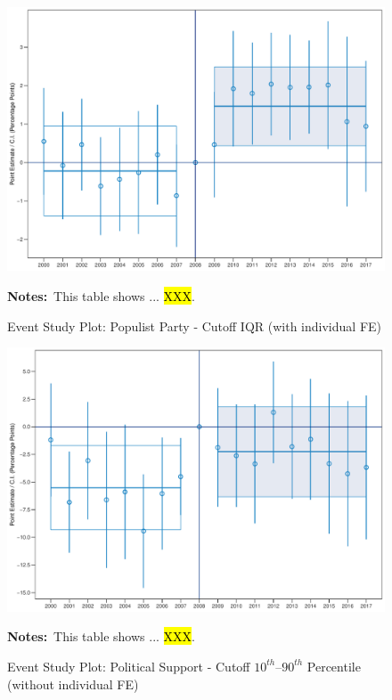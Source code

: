 \documentclass[11pt]{article}
\begin{document}
\begin{figure}[htbp!]
    \centering
    \caption{Event Study Plot: Populist Party - Cutoff IQR (with individual FE)}\label{fig:dynamic_did_cbk_past_mean_pp_iqr_ife}
    \includegraphics[width=1\linewidth]{events/dynamic_did_cbk_past_mean_pp_iqr_ife}
    \begin{tablenotes}
        \footnotesize
        \item \textbf{Notes:}~This table shows ... \hl{XXX}.
    \end{tablenotes} 
\end{figure}

\begin{figure}[htbp!]
    \centering
    \caption{Event Study Plot: Political Support - Cutoff $10^{th}$--$90^{th}$ Percentile (without individual FE)}\label{fig:dynamic_did_cbk_past_mean_ps_1090_noife}
    \includegraphics[width=1\linewidth]{events/dynamic_did_cbk_past_mean_ps_1090_noife}
    \begin{tablenotes}
        \footnotesize
        \item \textbf{Notes:}~This table shows ... \hl{XXX}.
    \end{tablenotes} 
\end{figure}
\end{document}
